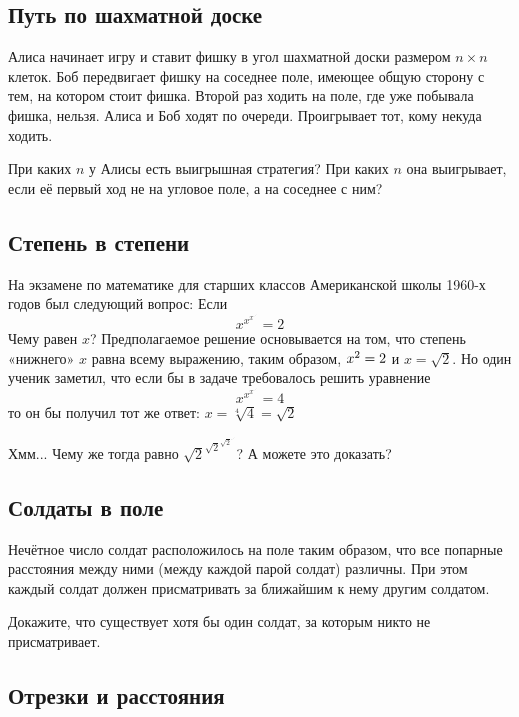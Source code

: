 \subsection*{Путь по шахматной доске} %

Алиса начинает игру и ставит фишку в угол шахматной доски размером $n{\times}n$ клеток.
Боб передвигает фишку на соседнее поле, имеющее общую сторону с тем, на котором стоит фишка.
Второй раз ходить на поле, где уже побывала фишка, нельзя. 
Алиса и Боб ходят по очереди.
Проигрывает тот, кому некуда ходить.

При каких $n$ у Алисы есть выигрышная стратегия? 
При каких $n$ она выигрывает, если её первый ход не на угловое поле, а на соседнее с ним?

\subsection*{Степень в степени} %

На экзамене по математике для старших классов Американской школы 1960-х годов 
был следующий вопрос:
Если 
$$x^{x^{x^{{\cdot}^{\cdot^{\cdot}}}}}=2$$
Чему равен $x$? 
Предполагаемое решение основывается на том, что степень «нижнего» $x$ равна всему выражению, таким образом, $x^2\z=2$ и $x=\sqrt{2}$.
Но один ученик заметил, что если бы в задаче требовалось решить уравнение
$$x^{x^{x^{{\cdot}^{\cdot^{\cdot}}}}}=4$$
то он бы получил тот же ответ: $x=\sqrt[4]{4}=\sqrt{2}$

Хмм...
Чему же тогда равно ${\sqrt{2}}^{{\sqrt{2}}^{{\sqrt{2}}^{{\cdot}^{\cdot^{\cdot}}}}}$? 
А можете это доказать?

\subsection*{Солдаты в поле} %

Нечётное число солдат расположилось на поле таким образом, что все попарные расстояния между ними (между каждой парой солдат) различны.
При этом каждый солдат должен присматривать за ближайшим к нему другим солдатом.

Докажите, что существует хотя бы один солдат, за которым никто не присматривает.

\subsection*{Отрезки и расстояния} %

